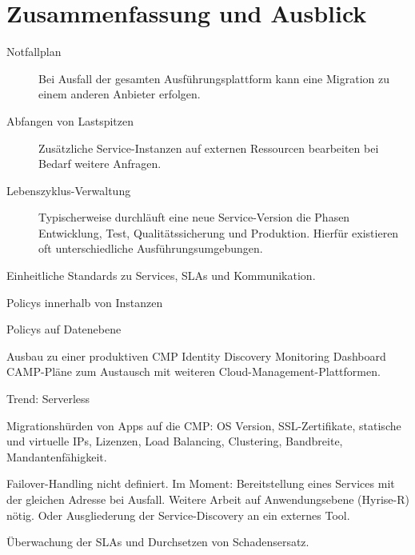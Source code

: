 %

\chapter{Zusammenfassung und Ausblick}

\begin{description}
	
	\item[Notfallplan] Bei Ausfall der gesamten Ausführungsplattform kann eine Migration zu einem anderen Anbieter erfolgen.
	
	\item[Abfangen von Lastspitzen] Zusätzliche Service-Instanzen auf externen Ressourcen bearbeiten bei Bedarf weitere Anfragen.
	
	\item[Lebenszyklus-Verwaltung] Typischerweise durchläuft eine neue Service-Version die Phasen Entwicklung, Test, Qualitätssicherung und Produktion. Hierfür existieren oft unterschiedliche Ausführungsumgebungen.
	
\end{description}


Einheitliche Standards zu Services, SLAs und Kommunikation.

Policys innerhalb von Instanzen 

Policys auf Datenebene

Ausbau zu einer produktiven CMP
Identity
Discovery
Monitoring
Dashboard
CAMP-Pläne zum Austausch mit weiteren Cloud-Management-Plattformen.

Trend: Serverless

Migrationshürden von Apps auf die CMP: OS Version, SSL-Zertifikate, statische und virtuelle IPs, Lizenzen, Load Balancing, Clustering, Bandbreite, Mandantenfähigkeit.

Failover-Handling nicht definiert. Im Moment: Bereitstellung eines Services mit der gleichen Adresse bei Ausfall. Weitere Arbeit auf Anwendungsebene (Hyrise-R) nötig. Oder Ausgliederung der Service-Discovery an ein externes Tool.

Überwachung der SLAs und Durchsetzen von Schadensersatz.
